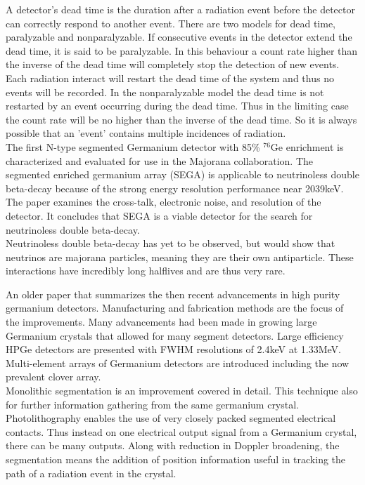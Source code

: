 \documentclass[12pt]{article}
\begin{document}
\begin{doublespacing}
A detector's dead time is the duration after a radiation event before the detector can correctly respond to another event.
There are two models for dead time, paralyzable and nonparalyzable. 
If consecutive events in the detector extend the dead time, it is said to be paralyzable. 
In this behaviour a count rate higher than the inverse of the dead time will completely stop the detection of new events. 
Each radiation interact will restart the dead time of the system and thus no events will be recorded. 
In the nonparalyzable model the dead time is not restarted by an event occurring during the dead time. 
Thus in the limiting case the count rate will be no higher than the inverse of the dead time.
So it is always possible that an 'event' contains multiple incidences of radiation.
\\



\cite{Leviner201466}
The first N-type segmented Germanium detector with 85\% $^{76}\mbox{Ge}$ enrichment is characterized and evaluated for use in the Majorana collaboration.
The segmented enriched germanium array (SEGA) is applicable to neutrinoless double beta-decay because of the strong energy resolution performance near 2039keV.
The paper examines the cross-talk, electronic noise, and resolution of the detector.
It concludes that SEGA is a viable detector for the search for neutrinoless double beta-decay.
\\

Neutrinoless double beta-decay has yet to be observed, but would show that neutrinos are majorana particles, meaning they are their own antiparticle.
These interactions have incredibly long halflives and are thus very rare.


\cite{Sangsingkeow2003183}
An older paper that summarizes the then recent advancements in high purity germanium detectors.
Manufacturing and fabrication methods are the focus of the improvements.
Many advancements had been made in growing large Germanium crystals that allowed for many segment detectors.
Large efficiency HPGe detectors are presented with FWHM resolutions of 2.4keV at 1.33MeV.
Multi-element arrays of Germanium detectors are introduced including the now prevalent clover array.
\\

Monolithic segmentation is an improvement covered in detail.
This technique also for further information gathering from the same germanium crystal.
Photolithography enables the use of very closely packed segmented electrical contacts.
Thus instead on one electrical output signal from a Germanium crystal, there can be many outputs.
Along with reduction in Doppler broadening, the segmentation means the addition of position information useful in tracking the path of a radiation event in the crystal.



\end{doublespacing}
\end{document}
